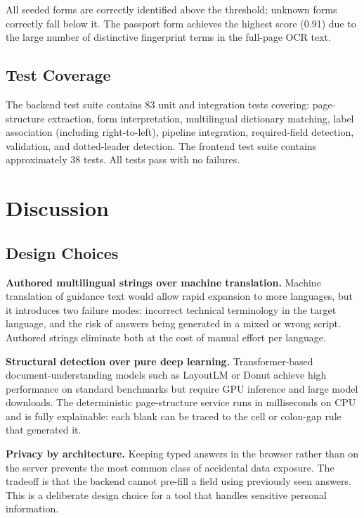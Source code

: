\documentclass[conference]{IEEEtran}
\begin{document}
All seeded forms are correctly identified above the threshold; unknown forms correctly fall below it. The passport form achieves the highest score (0.91) due to the large number of distinctive fingerprint terms in the full-page OCR text.

\subsection{Test Coverage}

The backend test suite contains 83 unit and integration tests covering: page-structure extraction, form interpretation, multilingual dictionary matching, label association (including right-to-left), pipeline integration, required-field detection, validation, and dotted-leader detection. The frontend test suite contains approximately 38 tests. All tests pass with no failures.

\section{Discussion}

\subsection{Design Choices}

\textbf{Authored multilingual strings over machine translation.} Machine translation of guidance text would allow rapid expansion to more languages, but it introduces two failure modes: incorrect technical terminology in the target language, and the risk of answers being generated in a mixed or wrong script. Authored strings eliminate both at the cost of manual effort per language.

\textbf{Structural detection over pure deep learning.} Transformer-based document-understanding models such as LayoutLM or Donut achieve high performance on standard benchmarks but require GPU inference and large model downloads. The deterministic page-structure service runs in milliseconds on CPU and is fully explainable: each blank can be traced to the cell or colon-gap rule that generated it.

\textbf{Privacy by architecture.} Keeping typed answers in the browser rather than on the server prevents the most common class of accidental data exposure. The tradeoff is that the backend cannot pre-fill a field using previously seen answers. This is a deliberate design choice for a tool that handles sensitive personal information.
\end{document}
